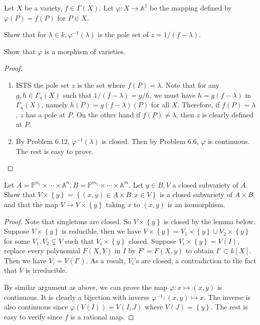 \documentclass{solution}
\begin{document}
\begin{problem}{6.19}
    Let $X$ be a variety, $f \in \Gamma(X)$. Let $\varphi: X \rightarrow \mathbb{A}^1$ be the mapping defined by $\varphi(P) = f(P)$ for $P \in X$. \begin{inparaenum}
        \item Show that for $\lambda \in k, \varphi ^{-1}(\lambda)$ is the pole set of $z = 1 / (f - \lambda)$.
        \item Show that $\varphi$ is a morphism of varieties.
    \end{inparaenum}
\end{problem}

\begin{proof}
    \begin{enumerate}
        \item ISTS the pole set $z$ is the set where $f(P) = \lambda$. Note that for any $g, h \in \Gamma_u(X)$ such that $1 / (f - \lambda) = g / h$, we must have $h = g(f - \lambda)$ in $\Gamma_u(X)$, namely $h(P) = g(f - \lambda)(P)$ for all $X$. Therefore, if $f(P) = \lambda$, $z$ has a pole at $P$. On the other hand if $f(P) \ne \lambda$, then $z$ is clearly defined at $P$.
        \item By Problem 6.12, $\varphi ^{-1} (\lambda)$ is closed. Then by Problem 6.6, $\varphi$ is continuous. The rest is easy to prove.
    \end{enumerate}
\end{proof}

\begin{problem}{6.20}
    Let $A = \mathbb{P}^{n_1} \times \cdots \times \mathbb{A}^n, B = \mathbb{P}^{m_1} \times \cdots \times \mathbb{A}^m$. Let $y \in B, V$ a closed subvariety of $A$. Show that $V \times \left\lbrace y \right\rbrace = \left\lbrace (x, y) \in A \times B: x \in V \right\rbrace$ is a closed subvariety of $A \times B$, and that the map $V \rightarrow V \times \left\lbrace y \right\rbrace$ taking $x$ to $(x, y)$ is an isomorphism.
\end{problem}

\begin{proof}
    Note that singletons are closed. So $V \times \left\lbrace y \right\rbrace$ is closed by the lemma below. Suppose $V \times \left\lbrace y \right\rbrace$ is reducible, then we have $V \times \left\lbrace y \right\rbrace = V_1 \times \left\lbrace y \right\rbrace \cup V_2 \times \left\lbrace y \right\rbrace$ for some $V_1, V_2 \subsetneq V$ such that $V_i \times \left\lbrace y \right\rbrace$ closed. Suppose $V_i \times \left\lbrace y \right\rbrace = V(I)$, replace every polynomial $F(X, Y)$ in $I$ by $F' = F(X, y)$ to obtain $I' \subset k[X]$. Then we have $V_i = V(I')$. As a result, $V_i$'s are closed, a contradiction to the fact that $V$ is irreducible.
    
    By similar argument as above, we can prove the map $\varphi: x \mapsto (x, y)$ is continuous. It is clearly a bijection with inverse $\varphi ^{-1}: (x, y) \mapsto x$. The inverse is also continuous since $\varphi(V(I)) = V(I, J)$ where $V(J) = \left\lbrace y \right\rbrace$. The rest is easy to verify since $f$ is a rational map.
\end{proof}
\end{document}
